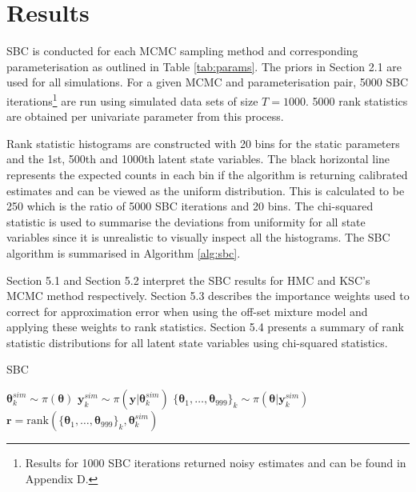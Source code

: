 \documentclass[12pt, a4paper]{article}
\begin{document}



\section{Results}
    SBC is conducted for each MCMC sampling method and corresponding parameterisation as outlined in Table \ref{tab:params}. The priors in Section 2.1 are used for all simulations. For a given MCMC and parameterisation pair, 5000 SBC iterations\footnote{Results for 1000 SBC iterations returned noisy estimates and can be found in Appendix D.} are run using simulated data sets of size $T=1000$. 5000 rank statistics are obtained per univariate parameter from this process. 
    
    Rank statistic histograms are constructed with 20 bins for the static parameters and the 1st, 500th and 1000th latent state variables. The black horizontal line represents the expected counts in each bin if the algorithm is returning calibrated estimates and can be viewed as the uniform distribution. This is calculated to be 250 which is the ratio of  5000 SBC iterations and 20 bins. The chi-squared statistic is used to summarise the deviations from uniformity for all state variables since it is unrealistic to visually inspect all the histograms. The SBC algorithm is summarised in Algorithm \ref{alg:sbc}.

    Section 5.1 and Section 5.2 interpret the SBC results for HMC and KSC's MCMC method respectively. Section 5.3 describes the importance weights used to correct for approximation error when using the off-set mixture model and applying these weights to rank statistics. Section 5.4 presents a summary of rank statistic distributions for all latent state variables using chi-squared statistics. 
    
    \begin{algorithm}
        \caption{SBC}\label{alg:sbc}
        \begin{algorithmic}
                \State {} $\boldsymbol{\theta}^{sim}_k \sim\pi (\boldsymbol{\theta})$
                \State {} $\boldsymbol{y}^{sim}_k \sim \pi(\boldsymbol{y}|\boldsymbol{\theta}^{sim}_k)$
                \State {} $\{\boldsymbol{\theta}_1,\dots , \boldsymbol{\theta}_{999}\}_k \sim \pi(\boldsymbol{\theta} | \boldsymbol{y}^{sim}_k)$
                \State {} $\boldsymbol{r} = \mathrm{rank}(\{\boldsymbol{\theta}_1,\dots , \boldsymbol{\theta}_{999}\}_k, \boldsymbol{\theta}^{sim}_k)$
              \EndFor
        \end{algorithmic}
        \end{algorithm}
        
\end{document}
